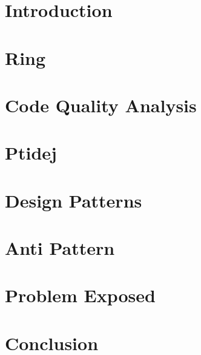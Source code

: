 {
\graphicspath{{TP2/}}
\newpage

\section{Introduction}
\label{sec:TP2/introduction}


\section{Ring}
\label{sec:ring}


\section{Code Quality Analysis}
\label{sec:TP2/context}


\section{Ptidej}
\label{sec:TP2/ptidej}


\section{Design Patterns}
\label{sec:TP2/patterns}


\section{Anti Pattern}
\label{sec:TP2/antipatterns}


\section{Problem Exposed}
\label{sec:TP2/p_exposed}



\newpage
\section{Conclusion}
\label{sec:TP2/conclusion}

}